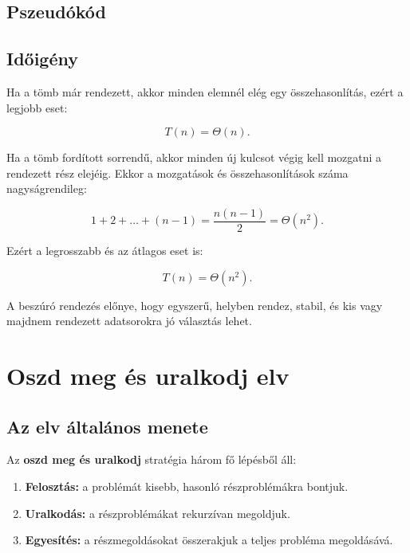 

\subsection{Pszeudókód}


\subsection{Időigény}

Ha a tömb már rendezett, akkor minden elemnél elég egy összehasonlítás, ezért a legjobb eset:

\[
T(n)=\Theta(n).
\]

Ha a tömb fordított sorrendű, akkor minden új kulcsot végig kell mozgatni a rendezett rész elejéig. Ekkor a mozgatások és összehasonlítások száma nagyságrendileg:

\[
1+2+\dots+(n-1)=\frac{n(n-1)}{2}=\Theta(n^2).
\]

Ezért a legrosszabb és az átlagos eset is:

\[
T(n)=\Theta(n^2).
\]

A beszúró rendezés előnye, hogy egyszerű, helyben rendez, stabil, és kis vagy majdnem rendezett adatsorokra jó választás lehet.

\section{Oszd meg és uralkodj elv}

\subsection{Az elv általános menete}

Az \textbf{oszd meg és uralkodj} stratégia három fő lépésből áll:

\begin{enumerate}
  \item \textbf{Felosztás:} a problémát kisebb, hasonló részproblémákra bontjuk.
  \item \textbf{Uralkodás:} a részproblémákat rekurzívan megoldjuk.
  \item \textbf{Egyesítés:} a részmegoldásokat összerakjuk a teljes probléma megoldásává.
\end{enumerate}

